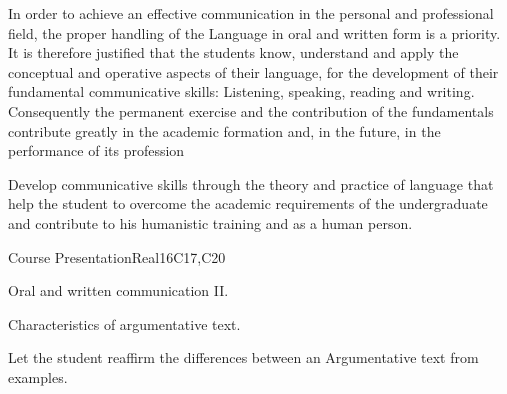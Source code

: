 \begin{syllabus}


\begin{justification}
In order to achieve an effective communication in the personal and professional field, the proper handling of the Language in oral and written form is a priority. It is therefore justified that the students know, understand and apply the conceptual and operative aspects of their language, for the development of their fundamental communicative skills: Listening, speaking, reading and writing.
Consequently the permanent exercise and the contribution of the fundamentals contribute greatly in the academic formation and, in the future, in the performance of its profession
\end{justification}

\begin{goals}
\item Develop communicative skills through the theory and practice of language that help the student to overcome the academic requirements of the undergraduate and contribute to his humanistic training and as a human person.
\end{goals}

\begin{outcomes}
   \item {}
   \item {}
   \item {}
\end{outcomes}

\begin{competences}
    \item {}
    \item {}
    \item {}
\end{competences}

\begin{unit}{Course Presentation}{}{Real}{16}{C17,C20}
  \begin{topics}
      \item Oral and written communication II.
      \item Characteristics of argumentative text.
  \end{topics}

  \begin{learningoutcomes}
   \item Let the student reaffirm the differences between an Argumentative text from examples.
  \end{learningoutcomes}
\end{unit}


\end{syllabus}
